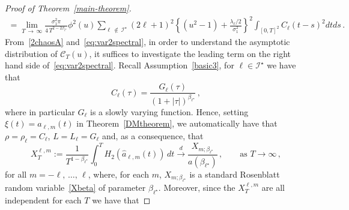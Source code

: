 \documentclass[10pt]{amsart}
\theoremstyle{definition}\newtheorem{defi}[theo]{Definition}\newtheorem{rema}[theo]{Remark}\newtheorem{exam}[theo]{Example}\newtheorem{exem}[theo]{Example}\newtheorem{nota}[theo]{Notation}
\newcommand{\clI}{\mathcal{I}}
\newcommand{\clC}{\mathcal{C}}
\begin{document}
\begin{proof}[Proof of Theorem~\ref{main-theorem}]
\begin{multline*}
=\lim_{T\,\to\,\infty}\frac{\sigma_{1}^{2}\pi }{4\,T^{2-2\beta_{\ell^\star}}}\phi ^{2}(u)\sum_{\ell\,\notin\,\clI^\star}(2\ell +1)^{2}\left\{\left(u^{2}-1\right)+\frac{\lambda_{\ell }/2}{\sigma_{1}^{2}}\right\} ^{2}\int_{[0,T]^{2}}C_{\ell }(t-s)^{2}dtds\,.
\end{multline*}
From~\eqref{2chaosA} and~\eqref{eq:var2spectral}, in order to understand the asymptotic distribution of $\clC_T(u)$, it suffices to investigate the leading term on the right hand side of~\eqref{eq:var2spectral}. Recall Assumption~\ref{basic3}, for $\ell\in \clI^\star$ we have that
\[
C_{\ell}(\tau)= \frac{G_\ell(\tau)}{(1+|\tau|)^{\beta_{\ell^\star}}} \,,
\]
where in particular $G_\ell$ is a slowly varying function. Hence, setting $\xi(t)=a_{\ell, m}(t)$ in Theorem~\ref{DMtheorem}, we automatically have that $\rho=\rho_\ell=C_{\ell}$, $L=L_\ell=G_\ell$ and, as a consequence, that
\begin{equation*}
X_T^{\ell, m}:=\frac{1}{T^{1-\beta_{\ell^\star}}}\int_0^T H_2(\widehat a_{\ell, m}(t))\, dt
\overset{d}{\longrightarrow} \frac{X_{m;\beta_{\ell^\star}}}{a\left(\beta_{\ell^\star}\right)}\,, \qquad \text{as } T \rightarrow
\infty\,,
\end{equation*}
for all $m=-\ell,\,\dots,\,\ell$, where, for each $m$, $X_{m;\beta_{\ell^\star}}$ is a standard Rosenblatt random variable~\eqref{Xbeta} of parameter $\beta_{\ell^\star}$. Moreover, since the $X_T^{\ell, m}$ are all independent for each $T$ we have that


\end{proof}
\end{document}
